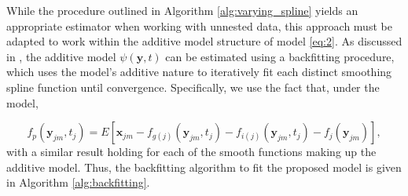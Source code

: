 \documentclass[11pt,reqno]{article}
\theoremstyle{definition}
\begin{document}
While the procedure outlined in Algorithm \ref{alg:varying_spline} yields an appropriate estimator when working with unnested data, this approach must be adapted to work within the additive model structure of model \ref{eq:2}. As discussed in \cite{hastieGeneralizedAdditiveModels1990}, the additive model $\psi(\mathbf{y}, t)$ can be estimated using a backfitting procedure, which uses the model's additive nature to iteratively fit each distinct smoothing spline function until convergence. Specifically, we use the fact that, under the model,

\[%
  f_p(\mathbf{y}_{jm}, t_{j}) = E\left[\mathbf{x}_{jm} - f_{g(j)}(\mathbf{y}_{jm}, t_{j}) - f_{i(j)}(\mathbf{y}_{jm}, t_{j}) - f_{j}(\mathbf{y}_{jm})\right]
,\]%
with a similar result holding for each of the smooth functions making up the additive model. Thus, the backfitting algorithm to fit the proposed model is given in Algorithm \ref{alg:backfitting}.
\end{document}
